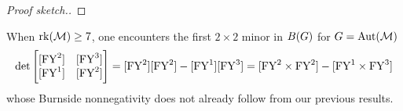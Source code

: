 \begin{proof}[Proof sketch.]
\begin{comment}
    [\FY^0] = [\FY^5], &\text{ and } [\FY^1] = [\FY^4].
    \end{align*}
These inequalities can be used to easily verify that any of the above minors are nonnegative. For example, to show that
    \[\det\begin{bmatrix}
    [\FY^3] & [\FY^5] \\
    [\FY^2] & [\FY^4]
    \end{bmatrix}
    = [\FY^3 \times \FY^4] - [\FY^2 \times \FY^5] \geq_{B(\subgroup)} 0,\]
we first use the fact that $[\FY^3] = [\FY^2]$ to see that
    \[[\FY^3 \times \FY^4] - [\FY^2 \times \FY^5] = [\FY^2 \times \FY^4] - [\FY^2 \times \FY5] = [\FY^2] \cdot \left([\FY^4]-[\FY^5]\right).\]
This is Burnside nonnegative because $[\FY^5] \leq_{B(\subgroup)} [\FY^4]$. As another example, consider the minor
    \[\det \begin{bmatrix}
    [\FY^4] & [\FY^5] \\
    [\FY^3] & [\FY^4]
    \end{bmatrix}
    = [\FY^4 \times \FY^4] - [\FY^5 \times \FY^3].\]
We use the fact that $[\FY^5]=[\FY^0]$, $[\FY^4]=[\FY^1]$, and $[\FY^3=\FY^2]$ to rewrite this determinant as
    \[\det \begin{bmatrix}
    [\FY^4] & [\FY^5] \\
    [\FY^3] & [\FY^4]
    \end{bmatrix} 
    = \det \begin{bmatrix}
    [\FY^1] & [\FY^0] \\
    [\FY^2] & [\FY^1]
    \end{bmatrix} 
    = \det \begin{bmatrix}
    [\FY^1] & [\FY^2] \\
    [\FY^0] & [\FY^1]
    \end{bmatrix},\]
which is Burnside nonnegative by Proposition~\ref{thm:2by2kos}.
\end{comment}
\end{proof}

\begin{remark} \rm
When $\operatorname{\mathrm{rk}}(\mathcal{M}) \geq 7$, one encounters the first $2 \times 2$ minor in $B(G)$ for $G=\operatorname{\mathrm{Aut}}(\mathcal{M})$
$$
\det 
\left[
\begin{matrix}
    [\FY^2] & [\FY^3] \\
    [\FY^1] & [\FY^2]
\end{matrix}
\right]
=
[\FY^2] [\FY^2] - [\FY^1] [\FY^3]
=[ \FY^2 \times \FY^2 ] - [\FY^1 \times \FY^3]
$$
whose Burnside nonnegativity does not already follow from our previous results.
\end{remark}

